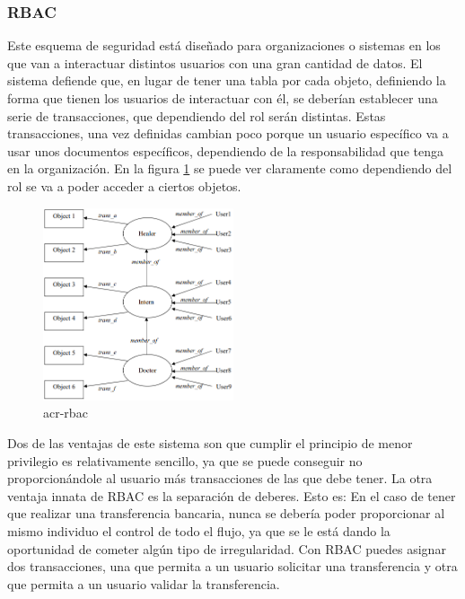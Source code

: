 \documentclass[twoside, titlepage, 12pt, a4paper]{article}
\begin{document}
\subsubsection{\gls{RBAC}}
Este esquema de seguridad está diseñado para organizaciones o sistemas en los que van a interactuar distintos usuarios con una gran cantidad de datos. El sistema defiende que, en lugar de tener una tabla por cada objeto, definiendo la forma que tienen los usuarios de interactuar con él, se deberían establecer una serie de transacciones, que dependiendo del rol serán distintas. Estas transacciones, una vez definidas cambian poco porque un usuario específico va a usar unos documentos específicos, dependiendo de la responsabilidad que tenga en la organización. En la figura \ref{fig:RBAC} se puede ver claramente como dependiendo del rol se va a poder acceder a ciertos objetos.
\begin{figure}[H]
    \centering
    \includegraphics[width=0.5\textwidth]{Media/RBAC.PNG}
    \caption{\gls{acr-rbac}}
    \label{fig:RBAC}
\end{figure}
Dos de las ventajas de este sistema son que cumplir el principio de menor privilegio es relativamente sencillo, ya que se puede conseguir no proporcionándole  al usuario más transacciones de las que debe tener. La otra ventaja innata de \gls{RBAC} es la separación de deberes. Esto es: En el caso de tener que realizar una transferencia bancaria, nunca se debería poder proporcionar al mismo individuo el control de todo el flujo, ya que se le está dando la oportunidad de cometer algún tipo de irregularidad. Con RBAC puedes asignar dos transacciones, una que permita a un usuario solicitar una transferencia y otra que permita a un usuario validar la transferencia.
\end{document}

